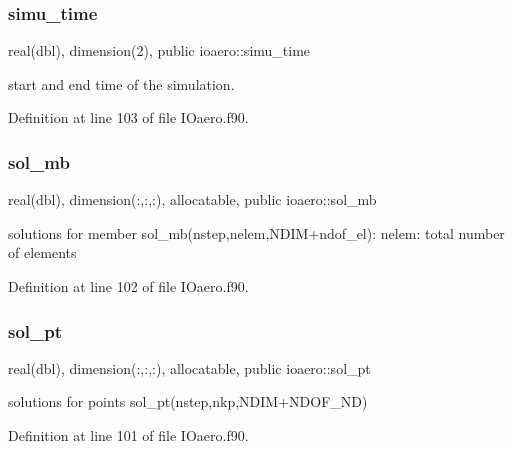\subsubsection{\texorpdfstring{simu\+\_\+time}{simu\_time}}
{\footnotesize\ttfamily real(dbl), dimension(2), public ioaero\+::simu\+\_\+time}



start and end time of the simulation. 



Definition at line 103 of file I\+Oaero.\+f90.

\mbox{\label{namespaceioaero_a4933d28025772ee22892dc12780a8eef}} 
\subsubsection{\texorpdfstring{sol\+\_\+mb}{sol\_mb}}
{\footnotesize\ttfamily real(dbl), dimension(\+:,\+:,\+:), allocatable, public ioaero\+::sol\+\_\+mb}



solutions for member sol\+\_\+mb(nstep,nelem,N\+D\+I\+M+ndof\+\_\+el)\+: nelem\+: total number of elements 



Definition at line 102 of file I\+Oaero.\+f90.

\mbox{\label{namespaceioaero_af6e62942bb38b7b7d69ea25972fe00bf}} 
\subsubsection{\texorpdfstring{sol\+\_\+pt}{sol\_pt}}
{\footnotesize\ttfamily real(dbl), dimension(\+:,\+:,\+:), allocatable, public ioaero\+::sol\+\_\+pt}



solutions for points sol\+\_\+pt(nstep,nkp,N\+D\+I\+M+\+N\+D\+O\+F\+\_\+\+ND) 



Definition at line 101 of file I\+Oaero.\+f90.

\mbox{\label{namespaceioaero_accb03392882ddfd413b5ac9ce3be09c6}} 
